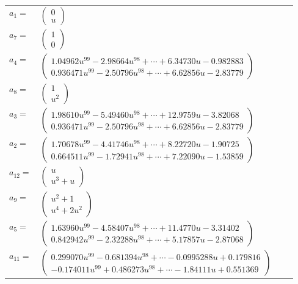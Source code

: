 \documentclass[1p]{elsarticle_modified}
\theoremstyle{definition}
\begin{document}
\begin{tabular}{m{7pt} m{180pt} m{7pt} m{180pt} }
\flushright $a_{1}=$&$\begin{pmatrix}0\\u\end{pmatrix}$ \\
\flushright $a_{7}=$&$\begin{pmatrix}1\\0\end{pmatrix}$ \\
\flushright $a_{4}=$&$\begin{pmatrix}1.04962 u^{99}-2.98664 u^{98}+\cdots+6.34730 u-0.982883\\0.936471 u^{99}-2.50796 u^{98}+\cdots+6.62856 u-2.83779\end{pmatrix}$ \\
\flushright $a_{8}=$&$\begin{pmatrix}1\\u^2\end{pmatrix}$ \\
\flushright $a_{3}=$&$\begin{pmatrix}1.98610 u^{99}-5.49460 u^{98}+\cdots+12.9759 u-3.82068\\0.936471 u^{99}-2.50796 u^{98}+\cdots+6.62856 u-2.83779\end{pmatrix}$ \\
\flushright $a_{2}=$&$\begin{pmatrix}1.70678 u^{99}-4.41746 u^{98}+\cdots+8.22720 u-1.90725\\0.664511 u^{99}-1.72941 u^{98}+\cdots+7.22090 u-1.53859\end{pmatrix}$ \\
\flushright $a_{12}=$&$\begin{pmatrix}u\\u^3+u\end{pmatrix}$ \\
\flushright $a_{9}=$&$\begin{pmatrix}u^2+1\\u^4+2 u^2\end{pmatrix}$ \\
\flushright $a_{5}=$&$\begin{pmatrix}1.63960 u^{99}-4.58407 u^{98}+\cdots+11.4770 u-3.31402\\0.842942 u^{99}-2.32288 u^{98}+\cdots+5.17857 u-2.87068\end{pmatrix}$ \\
\flushright $a_{11}=$&$\begin{pmatrix}0.299070 u^{99}-0.681394 u^{98}+\cdots-0.0995288 u+0.179816\\-0.174011 u^{99}+0.486273 u^{98}+\cdots-1.84111 u+0.551369\end{pmatrix}$ \\

\end{tabular}
\end{document}
